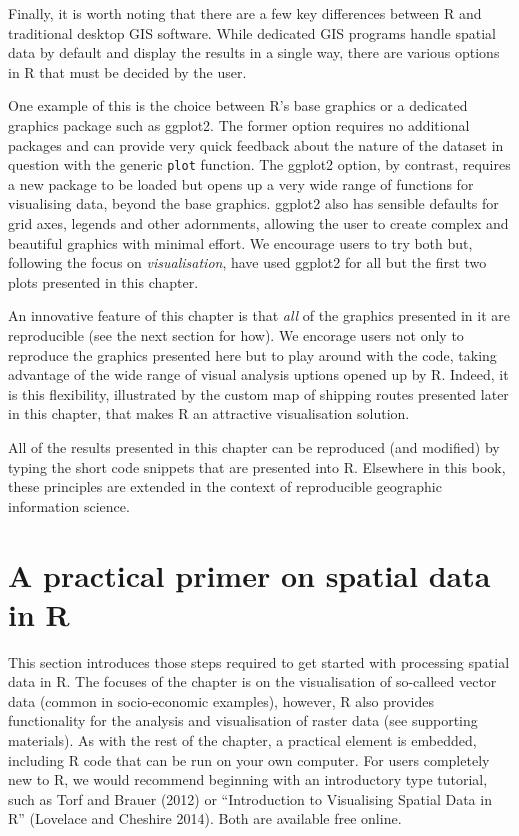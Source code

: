 \documentclass[]{article}
\begin{document}
Finally, it is worth noting that there are a few key differences between R and
traditional desktop GIS software. While dedicated GIS programs
handle spatial data by default and display the results in a single way,
there are various options in R that must be decided by the user.

One example of this is the choice between R's base graphics or a dedicated graphics package
such as ggplot2. The former option requires no additional packages and
can provide very quick feedback about the nature of the dataset in question
with the generic \texttt{plot} function. The ggplot2 option, by contrast,
requires a new package to be loaded but opens up a very wide range of
functions for visualising data, beyond the base graphics. ggplot2 also
has sensible defaults for grid axes, legends and other adornments,
allowing the user to create complex and beautiful graphics with
minimal effort. We encourage users to try both but, following the
focus on \emph{visualisation}, have used ggplot2 for all but the first two plots
presented in this chapter.

An innovative feature of this chapter is that \emph{all} of the graphics
presented in it are reproducible (see the next section for how).
We encorage users not only to reproduce the
graphics presented here but to play around with the code, taking advantage of
the wide range of visual analysis uptions opened up by R.
Indeed, it is this flexibility, illustrated by the
custom map of shipping routes presented later in this chapter, that makes R
an attractive visualisation solution. 

All of the
results presented in this chapter can be reproduced (and modified) by typing
the short code snippets that are presented into R. Elsewhere in this book,
these principles are extended in the context of reproducible geographic
information science.

\section{A practical primer on spatial data in R}

This section introduces those steps required to get started with processing spatial data in R.
 The focuses of the chapter is on the visualisation of so-calleed vector data (common in socio-economic examples), however, R also provides functionality for the analysis and visualisation of raster data (see supporting materials). As with the rest of the chapter,  a practical element is embedded, including R code that can be run on your own computer. For users
completely new to R, we would recommend beginning with an introductory
type tutorial, such as Torf and Brauer (2012) or ``Introduction to Visualising Spatial Data in R'' (Lovelace and
Cheshire 2014). Both are available free online.
\end{document}
